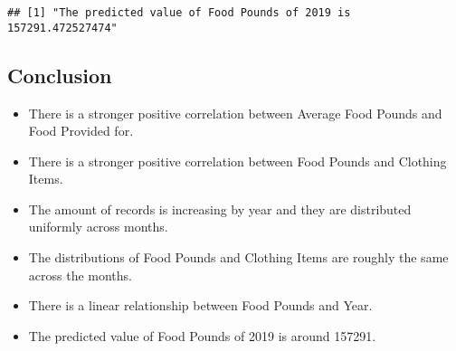 \documentclass[]{article}
\providecommand{\tightlist}{%
  \setlength{\itemsep}{0pt}\setlength{\parskip}{0pt}}
\begin{document}
\begin{verbatim}
## [1] "The predicted value of Food Pounds of 2019 is 157291.472527474"
\end{verbatim}

\hypertarget{conclusion}{%
\subsection{Conclusion}\label{conclusion}}

\begin{itemize}
\tightlist
\item
  There is a stronger positive correlation between Average Food Pounds
  and Food Provided for.
\item
  There is a stronger positive correlation between Food Pounds and
  Clothing Items.
\item
  The amount of records is increasing by year and they are distributed
  uniformly across months.
\item
  The distributions of Food Pounds and Clothing Items are roughly the
  same across the months.
\item
  There is a linear relationship between Food Pounds and Year.
\item
  The predicted value of Food Pounds of 2019 is around 157291.
\end{itemize}
\end{document}
